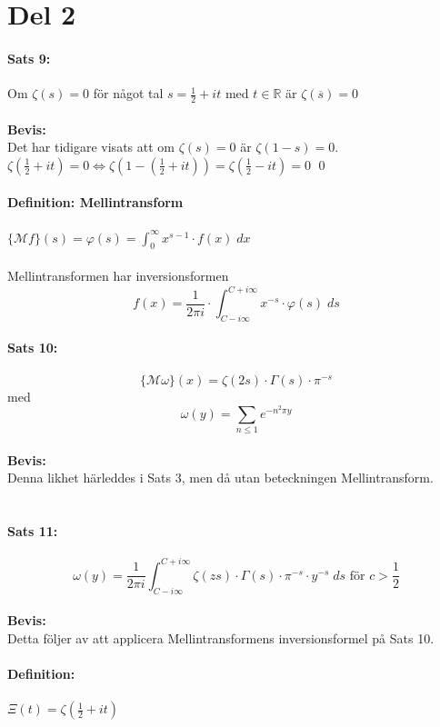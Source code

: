 \documentclass{article}%
\begin{document}
\section*{Del 2}
\paragraph{Sats 9:} Om $\zeta(s) = 0$ för något tal $s = \frac 1 2 + it$ med $t \in \mathbb{R}$ är $\zeta(\overline{s}) = 0$ \\
\\
{\bf Bevis:}\\
Det har tidigare visats att om $\zeta(s) = 0$ är $\zeta(1 - s) = 0$. $\zeta(\frac 1 2 + it) = 0 \Leftrightarrow 
\zeta(1 - (\frac 1 2 + it)) = \zeta(\frac 1 2 - it) = 0$
\hfill \qed

\paragraph{Definition: Mellintransform} $\{\mathcal{M}f\}(s) = \varphi(s) = \int_0^\infty x^{s - 1} \cdot f(x) \; dx $ \\
\\
Mellintransformen har inversionsformen
\[
	f(x) = \frac {1} {2 \pi i} \cdot \int_{C - i \infty}^{C + i \infty} x^{-s} \cdot \varphi(s) \; ds
\]

\paragraph{Sats 10:} 
\[
	\{\mathcal{M} \omega \} (x) = \zeta(2s) \cdot \Gamma(s) \cdot \pi^{-s}
\]
med 
\[
	\omega(y) = \sum\limits_{n \leq 1} e^{-n^2\pi y}
\]
\\
{\bf Bevis:} \\ 
Denna likhet härleddes i Sats 3, men då utan beteckningen Mellintransform.\\
\\
\paragraph{Sats 11:} 
\[
	\omega(y) = \frac {1} {2\pi i} \int_{C - i\infty}^{C + i \infty} \zeta(zs) \cdot \Gamma(s) \cdot \pi^{-s} \cdot
		y^{-s} \; ds \text{ för } c > \frac 1 2
\] 
\\
{\bf Bevis:}\\
Detta följer av att applicera Mellintransformens inversionsformel på Sats 10.\\

\paragraph{Definition:} $\Xi(t) = \zeta(\frac 1 2 + it)$ \\
\\
\end{document}
